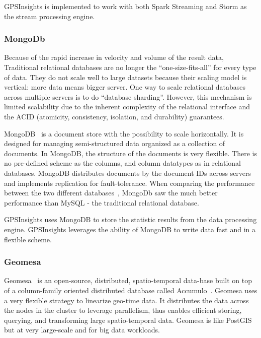 \documentclass{acm_proc_article-sp}
\begin{document}
GPSInsights is implemented to work with both Spark Streaming and Storm as the stream processing engine.

\subsubsection{MongoDb}

Because of the rapid increase in velocity and volume of the result data, Traditional relational databases are no longer the ``one-size-fits-all'' for every type of data. They do not scale well to large datasets because their scaling model is vertical: more data means bigger server. One way to scale relational databases across multiple servers is to do ``database sharding''. However, this mechanism is limited scalability due to the inherent complexity of the relational interface and the ACID (atomicity, consistency, isolation, and durability) guarantees. 

MongoDB~\cite{mongodbweb} is a document store with the possibility to scale horizontally. It is designed for managing semi-structured data organized as a collection of documents. In MongoDB, the structure of the documents is very flexible. There is no pre-defined scheme as the columns, and column datatypes as in relational databases. MongoDB distributes documents by the document IDs across servers and implements replication for fault-tolerance. When comparing the performance between the two different databases~\cite{Wu:Comparisons}, MongoDb saw the much better performance than MySQL - the traditional relational database.

GPSInsights uses MongoDB to store the statistic results from the data processing engine. GPSInsights leverages the ability of MongoDB to write data fast and in a flexible scheme. 

\subsubsection{Geomesa}
 
Geomesa~\cite{fox2013spatio} is an open-source, distributed, spatio-temporal data-base built on top of a column-family oriented distributed database called Accumulo~\cite{accumuloonline}. Geomesa uses a very flexible strategy to linearize geo-time data. It distributes the data across the nodes in the cluster to leverage parallelism, thus enables efficient storing, querying, and transforming large spatio-temporal data. Geomesa is like PostGIS~\cite{posgis} but at very large-scale and for big data workloads. 
\end{document}
